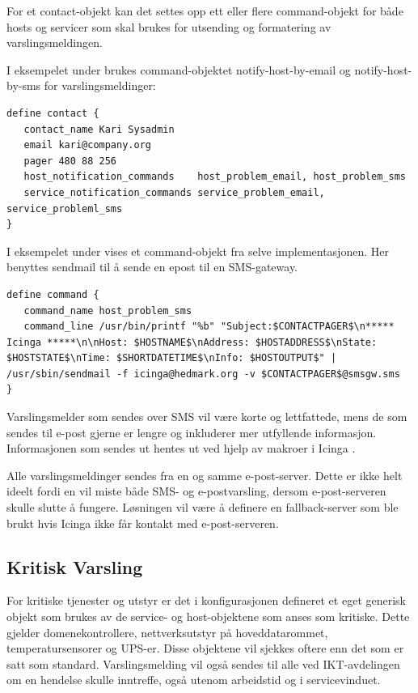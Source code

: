 For et contact-objekt kan det settes opp ett eller flere command-objekt for både hosts og servicer som skal brukes for utsending og formatering av varslingsmeldingen.  

I eksempelet under brukes command-objektet notify-host-by-email og notify-host-by-sms for varslingsmeldinger:
\begin{lstlisting}
define contact {
   contact_name Kari Sysadmin
   email kari@company.org
   pager 480 88 256 
   host_notification_commands    host_problem_email, host_problem_sms
   service_notification_commands service_problem_email, service_probleml_sms
}
\end{lstlisting}

I eksempelet under vises et command-objekt fra selve implementasjonen. Her benyttes sendmail \cite{wiki:sendmail} til å sende en epost til en SMS-gateway.

\begin{lstlisting}
define command {
   command_name host_problem_sms
   command_line /usr/bin/printf "%b" "Subject:$CONTACTPAGER$\n***** Icinga *****\n\nHost: $HOSTNAME$\nAddress: $HOSTADDRESS$\nState: $HOSTSTATE$\nTime: $SHORTDATETIME$\nInfo: $HOSTOUTPUT$" | /usr/sbin/sendmail -f icinga@hedmark.org -v $CONTACTPAGER$@smsgw.sms
}
\end{lstlisting}

Varslingsmelder som sendes over SMS vil være korte og lettfattede, mens de som sendes til e-post gjerne er lengre og inkluderer mer utfyllende informasjon. Informasjonen som sendes ut hentes ut ved hjelp av makroer i Icinga \cite{icingamacro}. 

Alle varslingsmeldinger sendes fra en og samme e-post-server. Dette er ikke helt ideelt fordi en vil miste både SMS- og e-postvarsling, dersom e-post-serveren skulle slutte å fungere. Løsningen vil være å definere en fallback-server som ble brukt hvis Icinga ikke får kontakt med e-post-serveren. 

\subsection{Kritisk Varsling}

For kritiske tjenester og utstyr er det i konfigurasjonen defineret et eget generisk objekt som brukes av de service- og host-objektene som anses som kritiske. Dette gjelder domenekontrollere, nettverksutstyr på hoveddatarommet, temperatursensorer og UPS-er. Disse objektene vil sjekkes oftere enn det som er satt som standard. Varslingsmelding vil også sendes til alle ved IKT-avdelingen om en hendelse skulle inntreffe, også utenom arbeidstid og i servicevinduet.

